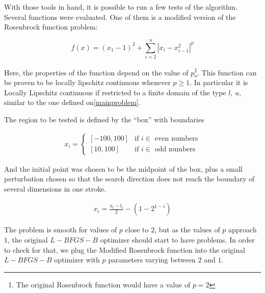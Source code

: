 With those tools in hand, it is possible to run a few tests of the algorithm. Several functions were evaluated. One of them is a modified version of the Rosenbrock function problem\citep{rosenbrock}:

\begin{equation} \label{modifiedrosenbrock}
    f(x) = (x_1 - 1)^2 + \sum_{i = 2}^n |x_i - x_{i - 1}^2|^p
\end{equation}

Here, the properties of the function depend on the value of $p$\footnote{The original Rosenbrock function would have a value of $p = 2$}. This function can be proven to be locally lipschitz continuous whenever $p \geq 1$. In particular it is Locally Lipschitz continuous if restricted to a finite domain of the type $l$, $u$, similar to the one defined on\ref{mainproblem}.

The region to be tested is defined by the ``box'' with boundaries

\begin{equation}
  \begin{aligned}
    x_i = 
    \begin{cases}
      [-100, 100] & \text{if } i \in \text{ even numbers} \\
      [10, 100] & \text{if } i \in \text{ odd numbers}
    \end{cases}
  \end{aligned}
\end{equation}

And the initial point was chosen to be the midpoint of the box, plus a small perturbation chosen so that the search direction does not reach the boundary of several dimensions in one stroke.

\begin{equation}
  \begin{aligned}
    x_i = \frac{u_i - l_i}{2} - (1 - 2^{1 - i})
  \end{aligned}
\end{equation}

The problem is smooth for values of $p$ close to $2$, but as the values of $p$ approach $1$, the original $L-BFGS-B$ optimizer should start to have problems. In order to check for that, we plug the Modified Rosenbrock function into the original $L-BFGS-B$ optimizer with $p$ parameters varying between $2$ and $1$. 


